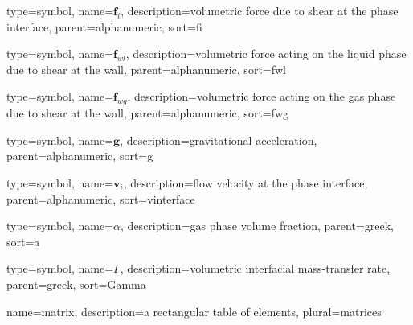 

{
  type=symbol,
	name={\ensuremath{\mathbf{f}_i}},
	description={volumetric force due to shear at the phase interface},
	parent=alphanumeric,
	sort={fi}
}

{
  type=symbol,
	name={\ensuremath{\mathbf{f}_{wl}}},
	description={volumetric force acting on the liquid phase due to shear at the wall},
	parent=alphanumeric,
	sort={fwl}
}

{
  type=symbol,
	name={\ensuremath{\mathbf{f}_{wg}}},
	description={volumetric force acting on the gas phase due to shear at the wall},
	parent=alphanumeric,
	sort={fwg}
}

{
  type=symbol,
	name={\ensuremath{\mathbf{g}}},
	description={gravitational acceleration},
	parent=alphanumeric,
	sort={g}
}

{
  type=symbol,
	name={\ensuremath{\mathbf{v}_i}},
	description={flow velocity at the phase interface},
	parent=alphanumeric,
	sort={vinterface}
}	

{
  type=symbol,
	name={\ensuremath{\alpha}},
	description={gas phase volume fraction},
	parent=greek,
	sort={a}
}	

{
	type=symbol,
	name={\ensuremath{\Gamma}},
	description={volumetric interfacial mass-transfer rate},
	parent=greek,
	sort={Gamma}
}
	


{name={matrix},%
    description={a rectangular table of elements},%
    plural={matrices}%
}



